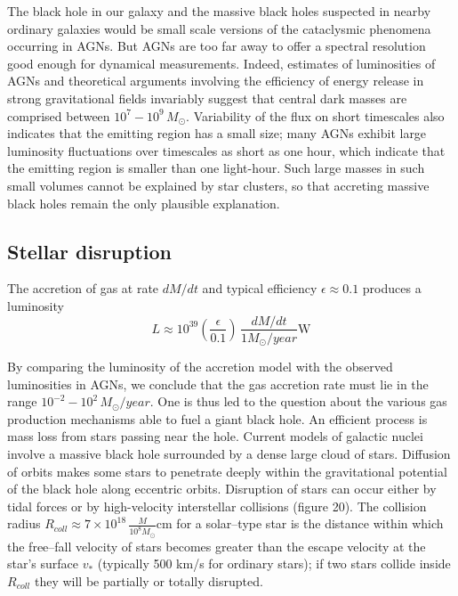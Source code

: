 \documentclass[12pt]{article}
\begin{document}
The black hole in our galaxy and the massive black holes suspected in nearby 
ordinary galaxies would be small scale versions of the cataclysmic 
phenomena occurring in AGNs. But AGNs are too far away to offer a
spectral resolution good enough for dynamical measurements. Indeed, 
estimates of luminosities of AGNs and theoretical arguments involving 
the efficiency of energy release in strong gravitational fields 
invariably suggest that central dark masses are comprised between $10^{7} - 10^{9} \, M_{\odot}$. 
Variability of the flux on short timescales also 
indicates that the emitting region has a small size; many AGNs exhibit large
luminosity fluctuations over timescales as short as one hour, which indicate 
that the emitting region is smaller than one light-hour. Such large masses 
in such small volumes cannot be explained by star clusters, so that accreting massive
 black holes remain the only plausible explanation.

\subsection {Stellar disruption}

The accretion of gas at rate  $dM/dt$ and typical efficiency 
$\epsilon \approx 0.1$ 
produces a luminosity 
\begin{equation}
        L \approx 10^{39} (\frac{\epsilon}{0.1}) \, \frac{dM/dt}{1 
        M_{\odot}/year}\textrm{W}
\end{equation}  

By comparing the luminosity of the accretion model with the 
observed luminosities in AGNs, we conclude that the gas accretion rate 
must lie in the range $10^{-2}- 10^{2} \, M_{\odot}/year$. One is thus 
led to the question about the 
various gas production mechanisms able to fuel a giant black hole. An 
efficient process is mass loss from stars passing near the hole. 
Current models of galactic nuclei involve a massive black hole 
surrounded by a dense large cloud of stars. Diffusion of orbits makes 
some stars to penetrate deeply within the gravitational potential 
of the black hole along eccentric orbits. Disruption of stars can occur
either by tidal forces or 
by high-velocity interstellar collisions (figure 20). 
The collision radius $R_{coll} \approx 7 \times 10^{18} \,
\frac{M}{10^8 M_{\odot}}$cm
for a solar--type star is the distance within which the 
free--fall velocity of stars becomes greater than the escape velocity 
at the star's surface $v_{*}$ (typically 500 km/s for ordinary 
stars); if two stars collide inside $R_{coll}$ they will be 
partially or totally disrupted.
\end{document}
